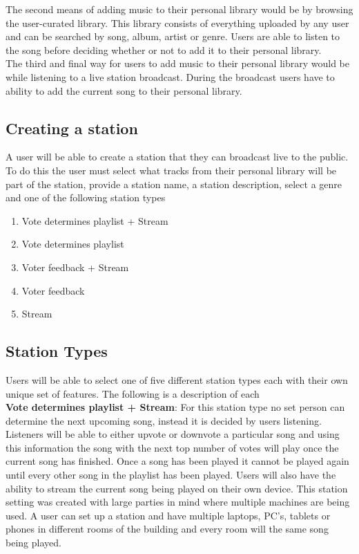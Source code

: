 \documentclass[a4paper, 12pt]{report}
\begin{document}
The second means of adding music to their personal library would be by browsing the user-curated library. This library consists of everything uploaded by any user and can be searched by song, album, artist or genre. Users are able to listen to the song before deciding whether or not to add it to their personal library.\\

The third and final way for users to add music to their personal library would be while listening to a live station broadcast. During the broadcast users have to ability to add the current song to their personal library.
 
\subsection{Creating a station}
A user will be able to create a station that they can broadcast live to the public. To do this the user must select what tracks from their personal library will be part of the station, provide a station name, a station description, select a genre and one of the following station types \begin{enumerate}
\item Vote determines playlist + Stream
\item Vote determines playlist
\item Voter feedback + Stream
\item Voter feedback
\item Stream
\end{enumerate}

\subsection{Station Types}
Users will be able to select one of five different station types each with their own unique set of features. The following is a description of each \\

\textbf{Vote determines playlist + Stream}: For this station type no set person can determine the next upcoming song, instead it is decided by users listening. Listeners will be able to either upvote or downvote a particular song and using this information the song with the next top number of votes will play once the current song has finished. Once a song has been played it cannot be played again until every other song in the playlist has been played. 
Users will also have the ability to stream the current song being played on their own device. This station setting was created with large parties in mind where multiple machines are being used. A user can set up a station and have multiple laptops, PC's, tablets or phones in different rooms of the building and every room will the same song being played. \\
\end{document}

